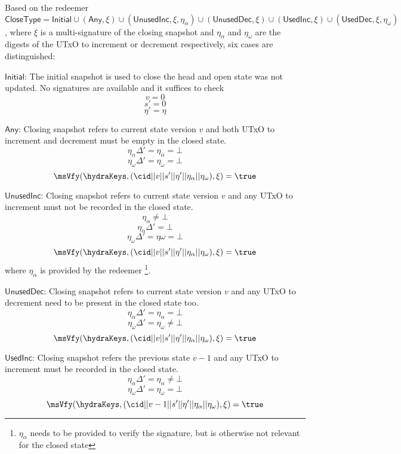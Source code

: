 \begin{menumerate}
  \item Based on the redeemer $\mathsf{CloseType} = \mathsf{Initial} \cup (\mathsf{Any}, \xi) \cup (\mathsf{UnusedInc}, \xi, \eta_\alpha) \cup (\mathsf{UnusedDec}, \xi) \cup (\mathsf{UsedInc}, \xi)  \cup (\mathsf{UsedDec}, \xi, \eta_\omega) $, where $\xi$ is a multi-signature of the closing snapshot and $\eta_\alpha$ and $\eta_\omega$ are the digests of the UTxO to increment or decrement respectively, six cases are distinguished:
  \begin{menumerate}
	\item $\mathsf{Initial}$: The initial snapshot is used to close the head and open state was not updated. No signatures are available and it suffices to check
	\[
	  v = 0
	\]
	\[
	  s' = 0
	\]
	\[
	  \eta' = \eta
	\]
    \item $\mathsf{Any}$: Closing snapshot refers to current state version $v$ and both UTxO to increment and decrement must be empty in the closed state.
	  \[
		\eta_\alpha\Delta' = \eta_\alpha = \bot
	  \]
	  \[
		\eta_\omega\Delta' = \eta_\omega = \bot
	  \]
	  \[
		\msVfy(\hydraKeys,(\cid || v || s' || \eta' || \eta_\alpha || \eta_\omega),\xi) = \true
	  \]
	  \item $\mathsf{UnusedInc}$: Closing snapshot refers to current state version $v$ and any UTxO to increment must not be recorded in the closed state.
	  \[
	    \eta_\alpha  \neq \bot
	  \]
	  \[
	    \eta_\alpha\Delta' = \bot
	  \]
	  \[
		\eta_\omega\Delta' = \eta\omega = \bot
	  \]
	  \[
		\msVfy(\hydraKeys,(\cid || v || s' || \eta' || \eta_\alpha || \eta_\omega),\xi) = \true
	  \]
	  where $\eta_\alpha$ is provided by the redeemer \footnote{$\eta_\alpha$ needs to be provided to verify the signature, but is otherwise not relevant for the closed state}.
	\item $\mathsf{UnusedDec}$: Closing snapshot refers to current state version $v$ and any UTxO to decrement need to be present in the closed state too.
	\[
	  \eta_\alpha\Delta' = \eta_\alpha = \bot
	\]
	\[
	  \eta_\omega\Delta' = \eta_\omega \neq \bot
	\]
	\[
	  \msVfy(\hydraKeys,(\cid || v || s' || \eta' || \eta_\alpha || \eta_\omega),\xi) = \true
	\]
	\item $\mathsf{UsedInc}$: Closing snapshot refers the previous state $v - 1$ and any UTxO to increment must be recorded in the closed state.
	  \[
		\eta_\alpha\Delta' = \eta_\alpha \neq \bot
	  \]
	  \[
	    \eta_\omega\Delta' = \eta_\omega = \bot
	  \]
	  \[
		\msVfy(\hydraKeys,(\cid || v - 1 || s' || \eta' || \eta_\alpha || \eta_\omega ),\xi) = \true
\]
\end{menumerate}
\end{menumerate}
